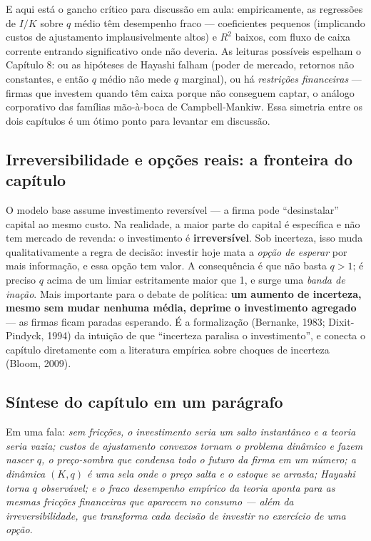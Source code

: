 \documentclass[11pt,a4paper]{article}
\newcommand{\ideia}[1]{\textcolor{destaque}{\textbf{#1}}}
\begin{document}
E aqui está o gancho crítico para discussão em aula: empiricamente, as
regressões de $I/K$ sobre $q$ médio têm desempenho fraco --- coeficientes
pequenos (implicando custos de ajustamento implausivelmente altos) e
$R^2$ baixos, com fluxo de caixa corrente entrando significativo onde
não deveria. As leituras possíveis espelham o Capítulo 8: ou as hipóteses
de Hayashi falham (poder de mercado, retornos não constantes, e então
$q$ médio não mede $q$ marginal), ou há \emph{restrições financeiras} ---
firmas que investem quando têm caixa porque não conseguem captar, o
análogo corporativo das famílias mão-à-boca de Campbell-Mankiw. Essa
simetria entre os dois capítulos é um ótimo ponto para levantar em
discussão.

\subsection{Irreversibilidade e opções reais: a fronteira do capítulo}

O modelo base assume investimento reversível --- a firma pode
``desinstalar'' capital ao mesmo custo. Na realidade, a maior parte do
capital é específica e não tem mercado de revenda: o investimento é
\ideia{irreversível}. Sob incerteza, isso muda qualitativamente a regra
de decisão: investir hoje mata a \emph{opção de esperar} por mais
informação, e essa opção tem valor. A consequência é que não basta
$q>1$; é preciso $q$ acima de um limiar estritamente maior que 1, e
surge uma \emph{banda de inação}. Mais importante para o debate de
política: \ideia{um aumento de incerteza, mesmo sem mudar nenhuma média,
deprime o investimento agregado} --- as firmas ficam paradas esperando.
É a formalização (Bernanke, 1983; Dixit-Pindyck, 1994) da intuição de
que ``incerteza paralisa o investimento'', e conecta o capítulo
diretamente com a literatura empírica sobre choques de incerteza
(Bloom, 2009).

\subsection{Síntese do capítulo em um parágrafo}

Em uma fala: \emph{sem fricções, o investimento seria um salto
instantâneo e a teoria seria vazia; custos de ajustamento convexos
tornam o problema dinâmico e fazem nascer $q$, o preço-sombra que
condensa todo o futuro da firma em um número; a dinâmica $(K,q)$ é uma
sela onde o preço salta e o estoque se arrasta; Hayashi torna $q$
observável; e o fraco desempenho empírico da teoria aponta para as
mesmas fricções financeiras que aparecem no consumo --- além da
irreversibilidade, que transforma cada decisão de investir no exercício
de uma opção}.
\end{document}
